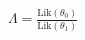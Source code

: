 \documentclass[preview]{standalone}
\begin{document}
\begin{align*}
\Lambda = \frac{\text{Lik}(\theta_0)}{\text{Lik}(\theta_1)}
\end{align*}
\end{document}
